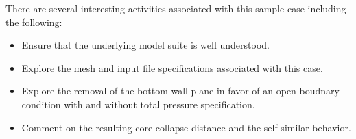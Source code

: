 \documentclass{article}
\begin{document}
There are several interesting activities associated with this sample case including
the following:

\begin{itemize}
	\item Ensure that the underlying model suite is well understood.
	\item Explore the mesh and input file specifications associated with this case.
	\item Explore the removal of the bottom wall plane in favor of an open boudnary condition with 
          and without total pressure specification.
        \item Comment on the resulting core collapse distance and the self-similar behavior.
\end{itemize}
\end{document}
